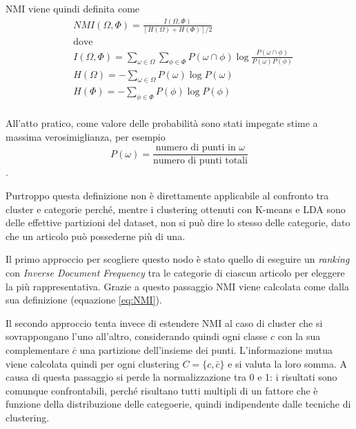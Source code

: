 \documentclass[
	12pt, %
	a4paper, %
	oneside, %
	headinclude,footinclude, %
	BCOR5mm, %
]{scrartcl}
\begin{document}
			NMI viene quindi definita come
			\begin{equation} \begin{aligned} \label{eq:NMI}
				& NMI(\Omega, \Phi) = \frac
					{I(\Omega, \Phi)}
					{\left[ H(\Omega) + H(\Phi)\right] / 2} \\
				& \text{dove} \\
				& I(\Omega, \Phi) =
					\sum_{\omega \in \Omega} \sum_{\phi \in \Phi}
						P(\omega \cap \phi) \log \frac {P(\omega \cap \phi)} {P(\omega) P(\phi)} \\
				& H(\Omega) = - \sum_{\omega \in \Omega} P(\omega) \log P(\omega) \\
				& H(\Phi) = - \sum_{\phi \in \Phi} P(\phi) \log P(\phi) \\
			\end{aligned} \end{equation}

			All'atto pratico, come valore delle probabilità sono stati impegate stime a massima verosimiglianza, per esempio
			\begin{equation*}
				P(\omega) = \frac
					{ \text{numero di punti in }\omega }
					{ \text{numero di punti totali} }
			\end{equation*}.

			\bigbreak

			Purtroppo questa definizione non è direttamente applicabile al confronto tra cluster e categorie perché, mentre i clustering ottenuti con K-means e LDA sono delle effettive partizioni del dataset, non si può dire lo stesso delle categorie, dato che un articolo può possederne più di una.

			Il primo approccio per scogliere questo nodo è stato quello di eseguire un \emph{ranking} con \emph{Inverse Document Frequency} tra le categorie di ciascun articolo per eleggere la più rappresentativa.
			Grazie a questo passaggio NMI viene calcolata come dalla sua definizione (equazione \ref{eq:NMI}).

			Il secondo approccio tenta invece di estendere NMI al caso di cluster che si sovrappongano l'uno all'altro, considerando quindi ogni classe $c$ con la sua complementare $\bar{c}$ una partizione dell'insieme dei punti.
			L'informazione mutua viene calcolata quindi per ogni clustering $C = \{c, \bar{c}\}$ e si valuta la loro somma. A causa di questa passaggio si perde la normalizzazione tra 0 e 1: i risultati sono comunque confrontabili, perché risultano tutti multipli di un fattore che è funzione della distribuzione delle categoerie, quindi indipendente dalle  tecniche di clustering.
\end{document}
